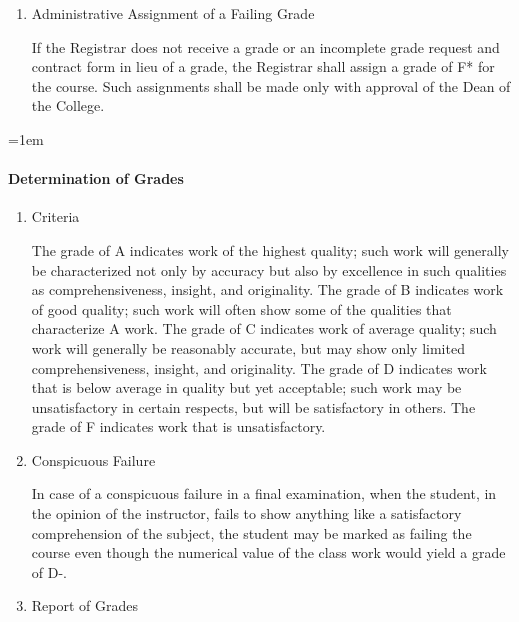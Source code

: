 \documentclass{manual}
\let\oldparagraph\paragraph
\renewcommand\paragraph{\leftskip=1em\oldparagraph}
\newcommand{\itemLevelA}{\alph*.}
\newcommand{\itemRefA}{\alph*}
\begin{document}
\begin{enumerate}[label=\itemLevelA,ref=\itemRefA]
				\item Administrative Assignment of a Failing Grade

					If the Registrar does not receive a grade or an incomplete grade request and contract form in lieu of a grade, the Registrar shall assign a grade of F* for the course. Such assignments shall be made only with approval of the Dean of the College.

				\end{enumerate}

			\paragraph{Determination of Grades}\label{par:DeterminationOfGrades}

				\begin{enumerate}[label=\itemLevelA,ref=\itemRefA]
				\item Criteria

					The grade of A indicates work of the highest quality; such work will generally be characterized not only by accuracy but also by excellence in such qualities as comprehensiveness, insight, and originality. The grade of B indicates work of good quality; such work will often show some of the qualities that characterize A work. The grade of C indicates work of average quality; such work will generally be reasonably accurate, but may show only limited comprehensiveness, insight, and originality. The grade of D indicates work that is below average in quality but yet acceptable; such work may be unsatisfactory in certain respects, but will be satisfactory in others. The grade of F indicates work that is unsatisfactory.
				
				\item Conspicuous Failure

					In case of a conspicuous failure in a final examination, when the student, in the opinion of the instructor, fails to show anything like a satisfactory comprehension of the subject, the student may be marked as failing the course even though the numerical value of the class work would yield a grade of D-.
				
				\item Report of Grades \label{item:ReportOfGrades}


\end{enumerate}
\end{document}
